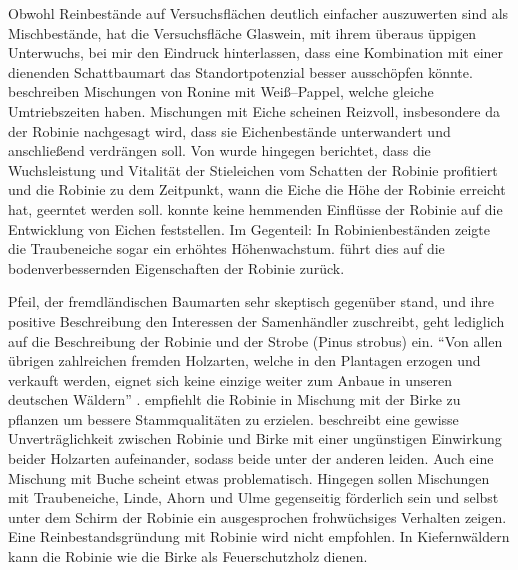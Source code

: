 \documentclass[twocolumn]{scrartcl}
\begin{document}
Obwohl Reinbestände auf Versuchsflächen deutlich einfacher auszuwerten sind als Mischbestände,
hat die Versuchsfläche Glaswein, mit ihrem überaus üppigen Unterwuchs, bei mir den Eindruck hinterlassen,
dass eine Kombination mit einer dienenden Schattbaumart das Standortpotenzial besser ausschöpfen könnte.
\citet{redei2006robiniePappel}
beschreiben Mischungen von Ronine mit Weiß--Pappel, welche gleiche
Umtriebszeiten haben. Mischungen mit Eiche scheinen Reizvoll,
insbesondere da der Robinie nachgesagt wird, dass sie Eichenbestände
unterwandert und anschließend verdrängen soll. Von \citet{kallina1888robinie} wurde
hingegen berichtet, dass die Wuchsleistung und Vitalität der
Stieleichen vom Schatten der Robinie profitiert und die Robinie zu dem
Zeitpunkt, wann die Eiche die Höhe der Robinie erreicht hat, geerntet
werden soll. \citet{feher2024robinie} konnte keine hemmenden Einflüsse
der Robinie auf die Entwicklung von Eichen feststellen. Im Gegenteil:
In Robinienbeständen zeigte die Traubeneiche sogar ein erhöhtes
Höhenwachstum. \citet{foeldes1903robinie} führt dies auf die
bodenverbessernden Eigenschaften der Robinie zurück.

\citet[S.~174ff]{pfeil1829deutscheWaldbaeume} Pfeil, der
fremdländischen Baumarten sehr skeptisch gegenüber stand, und ihre
positive Beschreibung den Interessen der Samenhändler zuschreibt, geht
lediglich auf die Beschreibung der Robinie und der Strobe (Pinus
strobus) ein. \enquote{Von allen übrigen zahlreichen fremden
  Holzarten, welche in den Plantagen erzogen und verkauft werden,
  eignet sich keine einzige weiter zum Anbaue in unseren deutschen
  Wäldern} \citep{pfeil1860holzzucht}.  \citet{pfeil1850robinie}
empfiehlt die Robinie in Mischung mit der Birke zu pflanzen um bessere
Stammqualitäten zu
erzielen. \citet[S.~88--96]{erteld1952robinieErtrag} beschreibt eine
gewisse Unverträglichkeit zwischen Robinie und Birke mit einer
ungünstigen Einwirkung beider Holzarten aufeinander, sodass beide
unter der anderen leiden. Auch eine Mischung mit Buche scheint etwas
problematisch. Hingegen sollen Mischungen mit Traubeneiche, Linde,
Ahorn und Ulme gegenseitig förderlich sein und selbst unter dem Schirm
der Robinie ein ausgesprochen frohwüchsiges Verhalten zeigen. Eine
Reinbestandsgründung mit Robinie wird nicht empfohlen. In Kiefernwäldern
kann die Robinie wie die Birke als Feuerschutzholz dienen.
\end{document}
